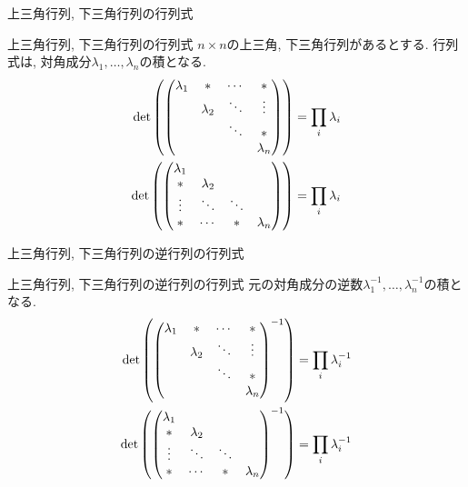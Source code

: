 \documentclass[dvipdfmx,notheorems,t]{beamer}
\begin{document}
\begin{frame}{上三角行列, 下三角行列の行列式}
\begin{block}{上三角行列, 下三角行列の行列式}
  $n \times n$の上三角, 下三角行列があるとする.
  行列式は, 対角成分$\lambda_1, \ldots, \lambda_n$の積となる.
  \begin{align*}
    \det\left( \mqty(\lambda_1 & * & \cdots & * \\
      & \lambda_2 & \ddots & \vdots \\
      & & \ddots & * \\
      & & & \lambda_n) \right) &= \prod_i \lambda_i \\
    \det\left( \mqty(\lambda_1 \\ * & \lambda_2 \\
      \vdots & \ddots & \ddots \\
      * & \cdots & * & \lambda_n) \right) &= \prod_i \lambda_i
  \end{align*}
\end{block}
\end{frame}

\begin{frame}{上三角行列, 下三角行列の逆行列の行列式}
\begin{block}{上三角行列, 下三角行列の逆行列の行列式}
  元の対角成分の逆数$\lambda_1^{-1}, \ldots, \lambda_n^{-1}$の積となる.
  \begin{align*}
    \det\left( \mqty(\lambda_1 & * & \cdots & * \\
      & \lambda_2 & \ddots & \vdots \\
      & & \ddots & * \\
      & & & \lambda_n)^{-1} \right) &= \prod_i \lambda_i^{-1} \\
    \det\left( \mqty(\lambda_1 \\ * & \lambda_2 \\
      \vdots & \ddots & \ddots \\
      * & \cdots & * & \lambda_n)^{-1} \right) &= \prod_i \lambda_i^{-1}
  \end{align*}
\end{block}
\end{frame}
\end{document}
